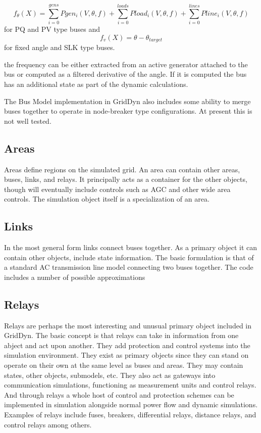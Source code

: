 \documentclass[12pt]{article} %
\begin{document}
\begin{equation}
f_{\theta}(X)=\sum_{i=0}^{gens}Pgen_i(V,\theta,f)+\sum_{i=0}^{loads}Pload_i(V,\theta,f)+\sum_{i=0}^{lines}Pline_i(V,\theta,f)
\end{equation}
for PQ and PV type buses and
\begin{equation}
f_v(X)=\theta-\theta_{target}
\end{equation}
for fixed angle and SLK type buses.

the frequency can be either extracted from an active generator attached to the bus or computed as a filtered derivative of the angle.  If it is computed the bus has an additional state as part of the dynamic calculations.

The Bus Model implementation in GridDyn also includes some ability to merge buses together to operate in node-breaker type configurations.  At present this is not well tested.

\subsection{Areas}
Areas define regions on the simulated grid.  An area can contain other areas, buses, links, and relays.  It principally acts as a container for the other objects, though will eventually include controls such as AGC and other wide area controls. The simulation object itself is a specialization of an area.

\subsection{Links}
In the most general form links connect buses together.  As a primary object it can contain other objects, include state information.  The basic formulation is that of a standard AC transmission line model connecting two buses together.  The code includes a number of possible approximations

\subsection{Relays}
Relays are perhaps the most interesting and unusual primary object included in GridDyn.  The basic concept is that relays can take in information from one abject and act upon another.   They add protection and control systems into the simulation environment.  They exist as primary objects since they can stand on operate on their own at the same level as buses and areas.  They may contain states, other objects, submodels, etc.  They also act as gateways into communication simulations, functioning as measurement units and control relays.  And through relays a whole host of control and protection schemes can be implemented in simulation alongside normal power flow and dynamic simulations.  Examples of relays include fuses, breakers, differential relays, distance relays, and control relays among others.
\end{document}
